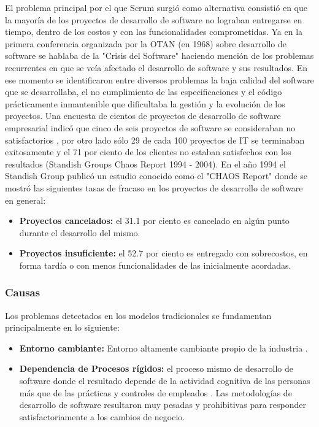 El problema principal por el que Scrum surgió como alternativa consistió en que la mayoría de los proyectos de desarrollo de software no lograban entregarse en tiempo, dentro de los costos y con las funcionalidades comprometidas. Ya en la primera conferencia organizada por la OTAN (en 1968) sobre desarrollo de software se hablaba de la "Crisis del Software" haciendo mención de los problemas recurrentes en que se veía afectado el desarrollo de software y sus resultados. En ese momento se identificaron entre diversos problemas la baja calidad del software que se desarrollaba, el no cumplimiento de las especificaciones y el código prácticamente inmantenible que dificultaba la gestión y la evolución de los proyectos. Una encuesta de cientos de proyectos de desarrollo de software empresarial indicó que cinco de seis proyectos de software se consideraban no satisfactorios \cite{AntiPatterns-1998}, por otro lado sólo 29 de cada 100 proyectos de IT se terminaban exitosamente y el 71 por ciento de los clientes no estaban satisfechos con los resultados (Standish Groups Chaos Report 1994 - 2004). En el año 1994 el Standish Group publicó un estudio conocido como el "CHAOS Report" \cite{CHAOS-Report-1994} donde se mostró las siguientes tasas de fracaso en los proyectos de desarrollo de software en general:

\begin{itemize}

\item \textbf{Proyectos cancelados:} el 31.1 por ciento es cancelado en algún punto durante el desarrollo del mismo.
\item \textbf{Proyectos insuficiente:} el 52.7 por ciento es entregado con sobrecostos, en forma tardía o con menos funcionalidades de las inicialmente acordadas.


\end{itemize}

\subsubsection{Causas}

Los problemas detectados en los modelos tradicionales se fundamentan principalmente en lo siguiente: 

\begin{itemize}

\item \textbf{Entorno cambiante:} Entorno altamente cambiante propio de la industria \cite{Martin-Alaimo-2014}.

\item \textbf{Dependencia de Procesos rígidos:} el proceso mismo de desarrollo de software donde el resultado depende de la actividad
cognitiva de las personas más que de las prácticas y controles de empleados \cite{Martin-Alaimo-2014}. Las metodologías de desarrollo de software resultaron muy pesadas y prohibitivas para responder satisfactoriamente a los cambios de negocio.

\end{itemize}

